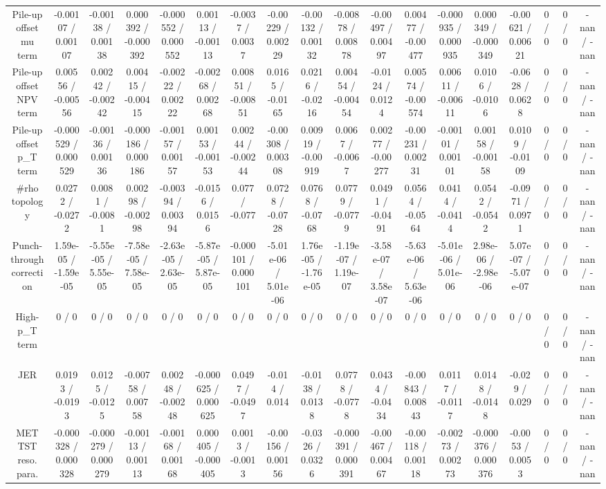\documentclass[10pt]{article}
\begin{document}
\begin{table}[htbp]
\begin{center}
\begin{tabular}{|c|c|c|c|c|c|c|c|c|c|c|c|c|c|c|c|c|c|}
  Pile-up offset mu term & -0.00107 / 0.00107 & -0.00138 / 0.00138 & 0.000392 / -0.000392 & -0.000552 / 0.000552 & 0.00113 / -0.00113 & -0.0037 / 0.0037 & -0.00229 / 0.00229 & -0.00132 / 0.00132 & -0.00878 / 0.00878 & -0.00497 / 0.00497 & 0.00477 / -0.00477 & -0.000935 / 0.000935 & 0.000349 / -0.000349 & -0.00621 / 0.00621 & 0 / 0 & 0 / 0 & -nan / -nan \\ 
  Pile-up offset NPV term & 0.00556 / -0.00556 & 0.00242 / -0.00242 & 0.00415 / -0.00415 & -0.00222 / 0.00222 & -0.00268 / 0.00268 & 0.00851 / -0.00851 & 0.0165 / -0.0165 & 0.0216 / -0.0216 & 0.00454 / -0.00454 & -0.0124 / 0.0124 & 0.00574 / -0.00574 & 0.00611 / -0.00611 & 0.0106 / -0.0106 & -0.0628 / 0.0628 & 0 / 0 & 0 / 0 & -nan / -nan \\ 
  Pile-up offset p_{T} term & -0.000529 / 0.000529 & -0.00136 / 0.00136 & -0.000186 / 0.000186 & -0.00157 / 0.00157 & 0.00153 / -0.00153 & 0.00244 / -0.00244 & -0.00308 / 0.00308 & 0.00919 / -0.00919 & 0.0067 / -0.0067 & 0.00277 / -0.00277 & -0.00231 / 0.00231 & -0.00101 / 0.00101 & 0.00158 / -0.00158 & 0.0109 / -0.0109 & 0 / 0 & 0 / 0 & -nan / -nan \\ 
  #rho topology & 0.0272 / -0.0272 & 0.0081 / -0.0081 & 0.00298 / -0.00298 & -0.00394 / 0.00394 & -0.0156 / 0.0156 & 0.077 / -0.077 & 0.0728 / -0.0728 & 0.0768 / -0.0768 & 0.0779 / -0.0779 & 0.0491 / -0.0491 & 0.0564 / -0.0564 & 0.0414 / -0.0414 & 0.0542 / -0.0542 & -0.0971 / 0.0971 & 0 / 0 & 0 / 0 & -nan / -nan \\ 
  Punch-through correction & 1.59e-05 / -1.59e-05 & -5.55e-05 / 5.55e-05 & -7.58e-05 / 7.58e-05 & -2.63e-05 / 2.63e-05 & -5.87e-05 / 5.87e-05 & -0.000101 / 0.000101 & -5.01e-06 / 5.01e-06 & 1.76e-05 / -1.76e-05 & -1.19e-07 / 1.19e-07 & -3.58e-07 / 3.58e-07 & -5.63e-06 / 5.63e-06 & -5.01e-06 / 5.01e-06 & 2.98e-06 / -2.98e-06 & 5.07e-07 / -5.07e-07 & 0 / 0 & 0 / 0 & -nan / -nan \\ 
  High-p_{T} term & 0 / 0 & 0 / 0 & 0 / 0 & 0 / 0 & 0 / 0 & 0 / 0 & 0 / 0 & 0 / 0 & 0 / 0 & 0 / 0 & 0 / 0 & 0 / 0 & 0 / 0 & 0 / 0 & 0 / 0 & 0 / 0 & -nan / -nan \\ 
  JER & 0.0193 / -0.0193 & 0.0125 / -0.0125 & -0.00758 / 0.00758 & 0.00248 / -0.00248 & -0.000625 / 0.000625 & 0.0497 / -0.0497 & -0.014 / 0.014 & -0.0138 / 0.0138 & 0.0778 / -0.0778 & 0.0434 / -0.0434 & -0.00843 / 0.00843 & 0.0117 / -0.0117 & 0.0148 / -0.0148 & -0.029 / 0.029 & 0 / 0 & 0 / 0 & -nan / -nan \\ 
  MET TST reso. para. & -0.000328 / 0.000328 & -0.000279 / 0.000279 & -0.00113 / 0.00113 & -0.00168 / 0.00168 & 0.000405 / -0.000405 & 0.0013 / -0.0013 & -0.00156 / 0.00156 & -0.0326 / 0.0326 & -0.000391 / 0.000391 & -0.00467 / 0.00467 & -0.00118 / 0.00118 & -0.00273 / 0.00273 & -0.000376 / 0.000376 & -0.0053 / 0.0053 & 0 / 0 & 0 / 0 & -nan / -nan \\ 

\end{tabular}
\end{center}
\end{table}
\end{document}
